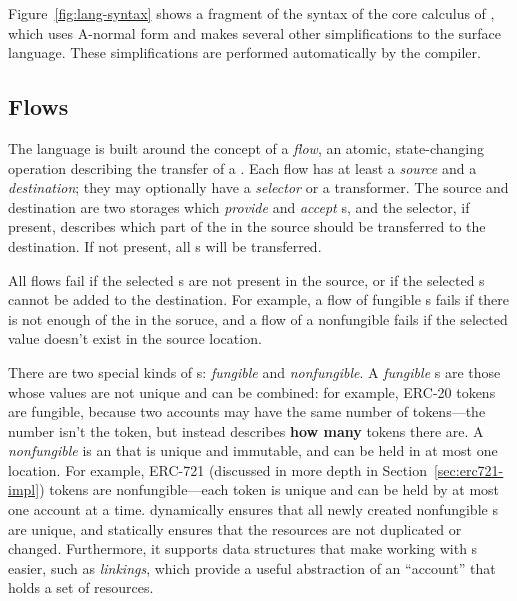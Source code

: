\documentclass[sigconf]{acmart}
\begin{document}
Figure~\ref{fig:lang-syntax} shows a fragment of the syntax of the core calculus of \langName, which uses A-normal form  and makes several other simplifications to the surface \langName language.
These simplifications are performed automatically by the compiler.

\subsection{Flows}
The \langName language is built around the concept of a \emph{flow}, an atomic, state-changing operation describing the transfer of a \assetTxt.
Each flow has at least a \emph{source} and a \emph{destination}; they may optionally have a \emph{selector} or a transformer.
The source and destination are two storages which \emph{provide} and \emph{accept} \assetTxt{}s, and the selector, if present, describes which part of the \assetTxt in the source should be transferred to the destination.
If not present, all \assetTxt{}s will be transferred.

All flows fail if the selected \assetTxt{}s are not present in the source, or if the selected \assetTxt{}s cannot be added to the destination.
For example, a flow of fungible \assetTxt{}s fails if there is not enough of the \assetTxt in the soruce, and a flow of a nonfungible \assetTxt fails if the selected value doesn't exist in the source location.

There are two special kinds of \assetTxt{}s: \emph{fungible} and \emph{nonfungible}.
A \emph{fungible} \assetTxt{}s are those whose values are not unique and can be combined: for example, ERC-20 tokens are fungible, because two accounts may have the same number of tokens---the number isn't the token, but instead describes \textbf{how many} tokens there are.
A \emph{nonfungible} \assetTxt is an \assetTxt that is unique and immutable, and can be held in at most one location.
For example, ERC-721  (discussed in more depth in Section~\ref{sec:erc721-impl}) tokens are nonfungible---each token is unique and can be held by at most one account at a time.
\langName dynamically ensures that all newly created nonfungible \assetTxt{}s are unique, and statically ensures that the resources are not duplicated or changed.
Furthermore, it supports data structures that make working with \assetTxt{}s easier, such as \emph{linkings}, which provide a useful abstraction of an ``account'' that holds a set of resources.
\end{document}
